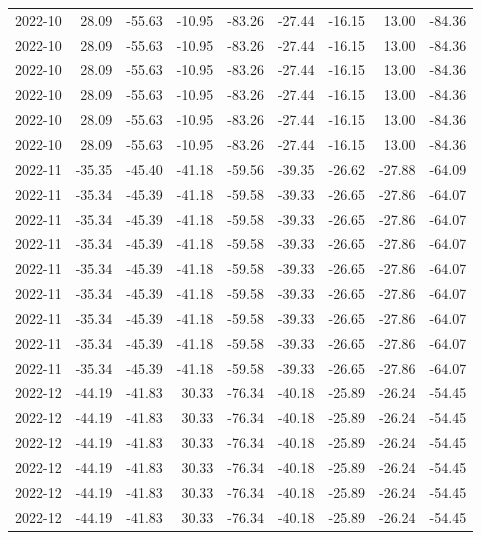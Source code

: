 \begin{table}[ht]
\begin{tabular}{lrrrrrrrr}
  2022-10 & 28.09 & -55.63 & -10.95 & -83.26 & -27.44 & -16.15 & 13.00 & -84.36 \\ 
  2022-10 & 28.09 & -55.63 & -10.95 & -83.26 & -27.44 & -16.15 & 13.00 & -84.36 \\ 
  2022-10 & 28.09 & -55.63 & -10.95 & -83.26 & -27.44 & -16.15 & 13.00 & -84.36 \\ 
  2022-10 & 28.09 & -55.63 & -10.95 & -83.26 & -27.44 & -16.15 & 13.00 & -84.36 \\ 
  2022-10 & 28.09 & -55.63 & -10.95 & -83.26 & -27.44 & -16.15 & 13.00 & -84.36 \\ 
  2022-10 & 28.09 & -55.63 & -10.95 & -83.26 & -27.44 & -16.15 & 13.00 & -84.36 \\ 
  2022-11 & -35.35 & -45.40 & -41.18 & -59.56 & -39.35 & -26.62 & -27.88 & -64.09 \\ 
  2022-11 & -35.34 & -45.39 & -41.18 & -59.58 & -39.33 & -26.65 & -27.86 & -64.07 \\ 
  2022-11 & -35.34 & -45.39 & -41.18 & -59.58 & -39.33 & -26.65 & -27.86 & -64.07 \\ 
  2022-11 & -35.34 & -45.39 & -41.18 & -59.58 & -39.33 & -26.65 & -27.86 & -64.07 \\ 
  2022-11 & -35.34 & -45.39 & -41.18 & -59.58 & -39.33 & -26.65 & -27.86 & -64.07 \\ 
  2022-11 & -35.34 & -45.39 & -41.18 & -59.58 & -39.33 & -26.65 & -27.86 & -64.07 \\ 
  2022-11 & -35.34 & -45.39 & -41.18 & -59.58 & -39.33 & -26.65 & -27.86 & -64.07 \\ 
  2022-11 & -35.34 & -45.39 & -41.18 & -59.58 & -39.33 & -26.65 & -27.86 & -64.07 \\ 
  2022-11 & -35.34 & -45.39 & -41.18 & -59.58 & -39.33 & -26.65 & -27.86 & -64.07 \\ 
  2022-12 & -44.19 & -41.83 & 30.33 & -76.34 & -40.18 & -25.89 & -26.24 & -54.45 \\ 
  2022-12 & -44.19 & -41.83 & 30.33 & -76.34 & -40.18 & -25.89 & -26.24 & -54.45 \\ 
  2022-12 & -44.19 & -41.83 & 30.33 & -76.34 & -40.18 & -25.89 & -26.24 & -54.45 \\ 
  2022-12 & -44.19 & -41.83 & 30.33 & -76.34 & -40.18 & -25.89 & -26.24 & -54.45 \\ 
  2022-12 & -44.19 & -41.83 & 30.33 & -76.34 & -40.18 & -25.89 & -26.24 & -54.45 \\ 
  2022-12 & -44.19 & -41.83 & 30.33 & -76.34 & -40.18 & -25.89 & -26.24 & -54.45 \\ 

\end{tabular}
\end{table}
